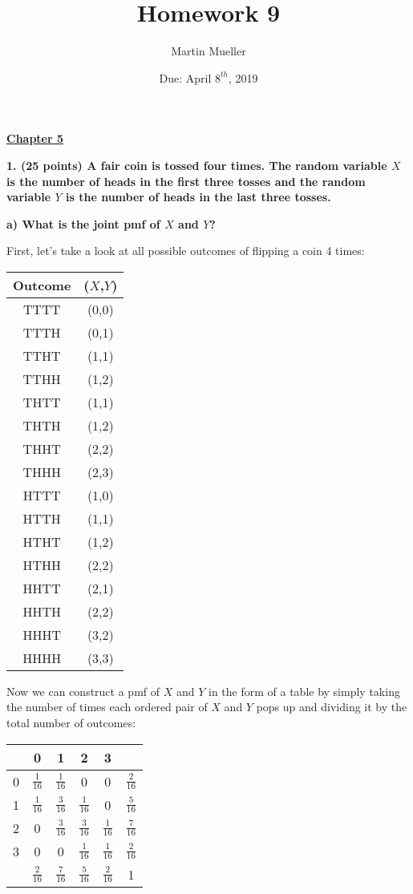 \documentclass[12pt, letter]{article}
\title{Homework 9}
\author{Martin Mueller}
\date{Due: April $8^{th}$, 2019}
\begin{document}
\maketitle

\begin{center}
	\underline{\textbf{Chapter 5}}
\end{center}

\textbf{1. (25 points) A fair coin is tossed four times. The random variable $X$ is the number of heads in the first three tosses and the random variable $Y$ is the number of heads in the last three tosses.}

\qquad \textbf{a) What is the joint pmf of $X$ and $Y$?}
\begin{center}
	First, let's take a look at all possible outcomes of flipping a coin 4 times:
	\newline
	\newline
	\begin{tabular}{c|c}
		Outcome & ($X$,$Y$) \\
		\hline
		TTTT & (0,0) \\
		TTTH & (0,1) \\
		TTHT & (1,1) \\
		TTHH & (1,2) \\
		THTT & (1,1) \\
		THTH & (1,2) \\
		THHT & (2,2) \\
		THHH & (2,3) \\
		HTTT & (1,0) \\
		HTTH & (1,1) \\
		HTHT & (1,2) \\
		HTHH & (2,2) \\
		HHTT & (2,1) \\
		HHTH & (2,2) \\
		HHHT & (3,2) \\
		HHHH & (3,3)
	\end{tabular}
	
	\pagebreak
	
	Now we can construct a pmf of $X$ and $Y$ in the form of a table by simply taking the number of times each ordered pair of $X$ and $Y$ pops up and dividing it by the total number of outcomes:
	\newline
	\newline
	\def\arraystretch{1.5}
	\begin{tabular}{c|cccc|c}
		\backslashbox{$Y$}{$X$} & 0 & 1 & 2 & 3 & \\
		\hline
		0 & $\frac{1}{16}$ & $\frac{1}{16}$ & 0 & 0 & $\frac{2}{16}$ \\
		1 & $\frac{1}{16}$ & $\frac{3}{16}$ & $\frac{1}{16}$ & 0 & $\frac{5}{16}$ \\
		2 & 0 & $\frac{3}{16}$ & $\frac{3}{16}$ & $\frac{1}{16}$ & $\frac{7}{16}$ \\
		3 & 0 & 0 & $\frac{1}{16}$ & $\frac{1}{16}$ & $\frac{2}{16}$ \\
		\hline
		& $\frac{2}{16}$ & $\frac{7}{16}$ & $\frac{5}{16}$ & $\frac{2}{16}$ & 1
	\end{tabular}
\end{center}
\end{document}
